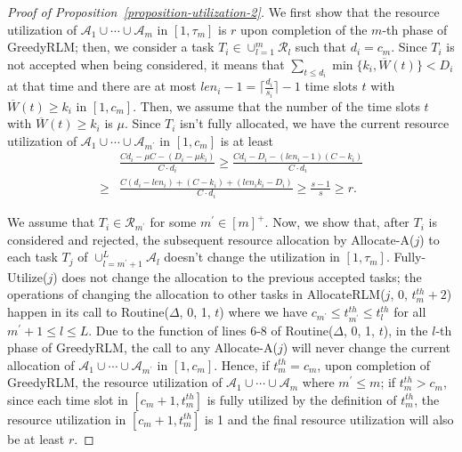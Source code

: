 \documentclass[10pt,journal,compsoc]{IEEEtran}
\begin{document}
\begin{proof}[Proof of Proposition~\ref{proposition-utilization-2}]
We first show that the resource utilization of $\mathcal{A}_{1}\cup\cdots\cup\mathcal{A}_{m}$ in $[1, \tau_{m}]$ is $r$ upon completion of the $m$-th phase of GreedyRLM; then, we consider a task $T_{i} \in \cup_{l=1}^{m}\mathcal{R}_{l}$ such that $d_{i} = c_{m}$. Since $T_{i}$ is not accepted when being considered, it means that $ \sum_{t\leq d_{i}}{\min\{k_{i}, \overline{W}(t)\}}<D_{i}$ at that time and there are at most $len_{i}-1=\lceil \frac{d_{i}}{s_{i}}\rceil-1$ time slots $t$ with $\overline{W}(t)\geq k_{i}$ in $[1, c_{m}]$. Then, we assume that the number of the time slots $t$ with $\overline{W}(t)\geq k_{i}$ is $\mu$. Since $T_{i}$ isn't fully allocated, we have the current resource utilization of $\mathcal{A}_{1}\cup\cdots\cup\mathcal{A}_{m^{\prime}}$ in $[1, c_{m}]$ is at least
\begin{align*}
&\frac{C  d_{i}-\mu C - (D_{i}-\mu k_{i})}{C\cdot d_{i}} \geq  \frac{Cd_{i}-D_{i} - (len_{i}-1)(C-k_{i})}{C\cdot d_{i}}\\
\geq  &  \frac{C(d_{i}-len_{i}) + (C-k_{i}) + (len_{i}k_{i}-D_{i})}{C\cdot d_{i}} \geq\frac{s-1}{s}\geq r.
\end{align*}


We assume that $T_{i}\in\mathcal{R}_{m^{\prime}}$ for some $m^{\prime}\in[m]^{+}$. Now, we show that, after $T_{i}$ is considered and rejected, the subsequent resource allocation by Allocate-A($j$) to each task $T_{j}$ of $\cup_{l=m^{\prime}+1}^{L}{\mathcal{A}_{l}}$ doesn't change the utilization in $[1, \tau_{m}]$. Fully-Utilize($j$) does not change the allocation to the previous accepted tasks; the operations of changing the allocation to other tasks in AllocateRLM($j$, 0, $t_{m}^{th}+2$) happen in its call to Routine($\Delta$, 0, 1, $t$) where we have $c_{m^{\prime}}\leq t_{m^{\prime}}^{th}\leq t_{l}^{th}$ for all $m^{\prime}+1\leq l\leq L$. Due to the function of lines 6-8 of Routine($\Delta$, 0, 1, $t$), in the $l$-th phase of GreedyRLM, the call to any Allocate-A($j$) will never change the current allocation of $\mathcal{A}_{1}\cup\cdots\cup\mathcal{A}_{m^{\prime}}$ in $[1, c_{m}]$. Hence, if $t^{th}_m = c_m$, upon completion of GreedyRLM, the resource utilization of $\mathcal{A}_{1}\cup\cdots\cup\mathcal{A}_{m}$ where $m^{\prime}\leq m$; if $t^{th}_{m} > c_{m}$, since each time slot in $[c_m+1, t^{th}_m]$ is fully utilized by the definition of $t^{th}_{m}$, the resource utilization in $[c_{m}+1, t^{th}_m]$ is 1 and the final resource utilization will also be at least $r$.
\end{proof}
\end{document}
